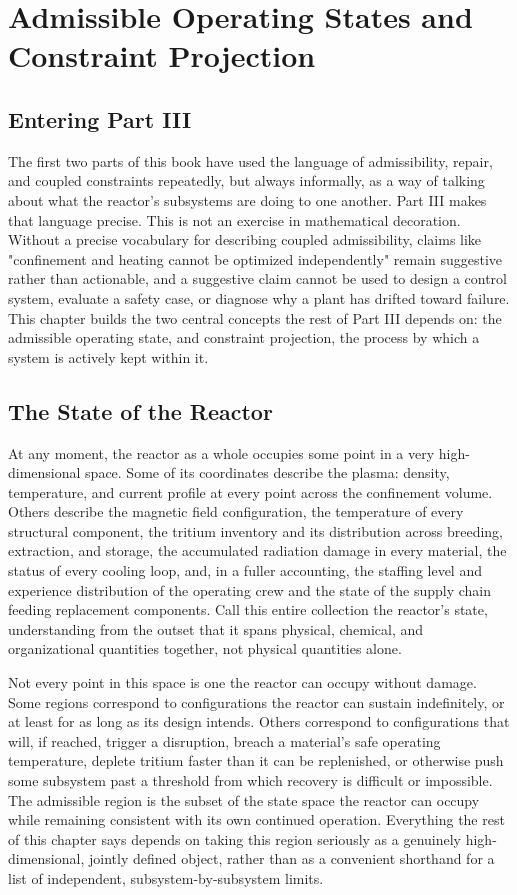 \chapter{Admissible Operating States and Constraint Projection}

\section{Entering Part III}

The first two parts of this book have used the language of admissibility, repair, and coupled constraints repeatedly, but always informally, as a way of talking about what the reactor's subsystems are doing to one another. Part III makes that language precise. This is not an exercise in mathematical decoration. Without a precise vocabulary for describing coupled admissibility, claims like "confinement and heating cannot be optimized independently" remain suggestive rather than actionable, and a suggestive claim cannot be used to design a control system, evaluate a safety case, or diagnose why a plant has drifted toward failure. This chapter builds the two central concepts the rest of Part III depends on: the admissible operating state, and constraint projection, the process by which a system is actively kept within it.

\section{The State of the Reactor}

At any moment, the reactor as a whole occupies some point in a very high-dimensional space. Some of its coordinates describe the plasma: density, temperature, and current profile at every point across the confinement volume. Others describe the magnetic field configuration, the temperature of every structural component, the tritium inventory and its distribution across breeding, extraction, and storage, the accumulated radiation damage in every material, the status of every cooling loop, and, in a fuller accounting, the staffing level and experience distribution of the operating crew and the state of the supply chain feeding replacement components. Call this entire collection the reactor's state, understanding from the outset that it spans physical, chemical, and organizational quantities together, not physical quantities alone.

Not every point in this space is one the reactor can occupy without damage. Some regions correspond to configurations the reactor can sustain indefinitely, or at least for as long as its design intends. Others correspond to configurations that will, if reached, trigger a disruption, breach a material's safe operating temperature, deplete tritium faster than it can be replenished, or otherwise push some subsystem past a threshold from which recovery is difficult or impossible. The admissible region is the subset of the state space the reactor can occupy while remaining consistent with its own continued operation. Everything the rest of this chapter says depends on taking this region seriously as a genuinely high-dimensional, jointly defined object, rather than as a convenient shorthand for a list of independent, subsystem-by-subsystem limits.

